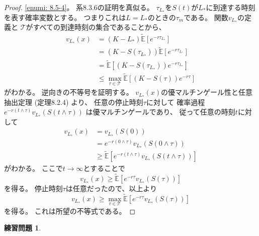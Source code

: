 \documentclass[uplatex]{jsarticle}
\theoremstyle{definition}
\newtheorem{prob}[prob]{練習問題}
\def\E{\mathbb{E}}
\def\mcT{\mathcal{T}}
\begin{document}
\begin{proof}
  \ref{enumi: 8.5-4}。
  系8.3.6の証明を真似る。
  \(\tau_{L_*}\)を\(S(t)\)が\(L_*\)に到達する時刻を表す確率変数とする。
  つまりこれは\(L=L_*\)のときの\(\tau_m\)である。
  関数\(v_{L_*}\)の定義と
  \(\mcT\)がすべての到達時刻の集合であることから、
  \begin{align*}
    v_{L_*}(x)
    &= (K-L_*)\tilde{\E}\left[ e^{-r\tau_{L_*}}\right] \\
    &= \left( K-S(\tau_{L_*}) \right) \tilde{\E}\left[ e^{-r\tau_{L_*}}\right] \\
    &= \tilde{\E}\left[ \left( K-S(\tau_{L_*}) \right) e^{-r\tau_{L_*}}\right] \\
    &\leq \max_{\tau\in \mcT}
    \tilde{\E}\left[ \left( K-S(\tau) \right) e^{-r\tau}\right]
  \end{align*}
  がわかる。
  逆向きの不等号を証明する。
  \(v_{L_*}(x)\)の優マルチンゲール性と任意抽出定理 (定理8.2.4) より、
  任意の停止時刻\(\tau\)に対して
  確率過程
  \(e^{-r(t\wedge\tau)}v_{L_*}\left(S(t\wedge \tau)\right)\)
  は優マルチンゲールであり、
  従って任意の時刻\(t\)に対して
  \begin{align*}
    v_{L_*}(x)
    &= v_{L_*}(S(0)) \\
    &= e^{-r(0\wedge\tau)}v_{L_*}(S(0\wedge\tau)) \\
    &\geq \tilde{\E}\left[
    e^{-r(t\wedge\tau)}v_{L_*}\left(S(t\wedge \tau)\right) \right]
  \end{align*}
  がわかる。
  ここで\(t\to \infty\)とすることで
  \[
  v_{L_*}(x) \geq \tilde{\E}\left[
  e^{-r\tau}v_{L_*}\left(S(\tau)\right) \right]
  \]
  を得る。
  停止時刻\(\tau\)は任意だったので、以上より
  \[
  v_{L_*}(x) \geq \max_{\tau\in\mcT}\tilde{\E}\left[
  e^{-r\tau}v_{L_*}\left(S(\tau)\right) \right]
  \]
  を得る。
  これは所望の不等式である。
\end{proof}










\begin{prob}\label{prob: 8.6}
\end{prob}
\end{document}
